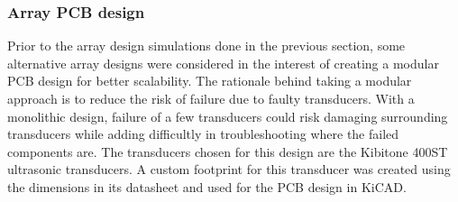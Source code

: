 \subsubsection{Array PCB design}
Prior to the array design simulations done in the previous section, some alternative array designs were considered in the interest of creating a modular PCB design for better scalability. The rationale behind taking a modular approach is to reduce the risk of failure due to faulty transducers. With a monolithic design, failure of a few transducers could risk damaging surrounding transducers while adding difficultly in troubleshooting where the failed components are. The transducers chosen for this design are the Kibitone 400ST ultrasonic transducers. A custom footprint for this transducer was created using the dimensions in its datasheet and used for the PCB design in KiCAD.

